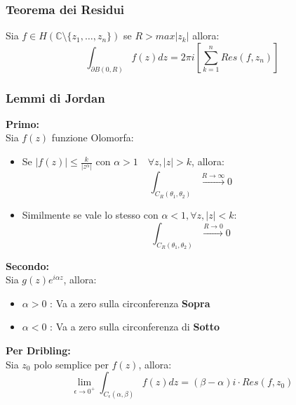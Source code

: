\documentclass[a4paper,notitlepage]{report}%
\newcommand{\C}{\mathbb{C}}
\begin{document}
\begin{multicols*}{2}
\subsubsection*{Teorema dei Residui}
Sia $f\in H(\C\setminus\{z_1,\dots, z_n\})$ se $R>max|z_k|$ allora:
\[
    \int_{\partial B(0,R)} f(z) dz = 2\pi i \left[\sum_{k=1}^n Res(f,z_n)\right]
\]
\subsubsection*{Lemmi di Jordan}
\textbf{Primo:}\\
Sia $f(z)$ funzione Olomorfa:  
\begin{itemize}
    \item Se $|f(z)|\leq \frac{k}{ |z^\alpha| } $ con $\alpha>1 \quad \forall z, |z | >k$, allora:\[
        \int_{C_R(\theta_1,\theta_2)} \xrightarrow{R\rightarrow\infty} 0
    \]
    \item Similmente se vale lo stesso con $\alpha<1, \forall z, |z|<k$:\[
        \int_{C_R(\theta_1,\theta_2)} \xrightarrow{R\rightarrow 0} 0
    \]
\end{itemize}
\textbf{Secondo:}\\
Sia $g(z)e^{i\alpha z}$, allora:
\begin{itemize}
    \item $\alpha>0$ : Va a zero sulla circonferenza \textbf{Sopra}
    \item $\alpha<0$ : Va a zero sulla circonferenza di \textbf{Sotto}
\end{itemize}
\textbf{Per Dribling:}\\
Sia $z_0$ polo semplice per $f(z)$, allora:\[
    \lim\limits_{\epsilon\rightarrow 0^+} \int_{C_\epsilon(\alpha, \beta)} f(z) dz = (\beta-\alpha)i\cdot Res(f,z_0)
\]


\end{multicols*}
\end{document}
